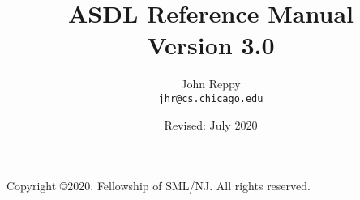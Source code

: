 \documentclass[11pt,letterpaper]{book}
\title{
  ASDL Reference Manual \\
  Version 3.0}
\author{
  John Reppy\\
  \texttt{jhr@cs.chicago.edu}}
\date{Revised: July 2020}
\begin{document}
\frontmatter

\maketitle

\phantom{.}

\noindent Copyright \copyright{}2020.  Fellowship of SML/NJ.  All rights reserved.

\vskip 12pt

\pagebreak

\tableofcontents

\mainmatter


\newpage


%
%




%



\backmatter



\end{document}
